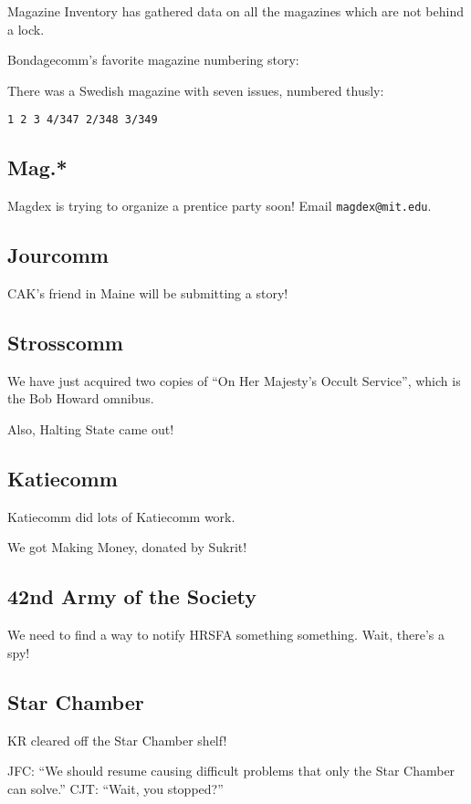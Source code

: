 \documentclass[10pt]{article}
\begin{document}
Magazine Inventory has gathered data on all the magazines which are not behind a lock.

Bondagecomm's favorite magazine numbering story:

There was a Swedish magazine with seven issues, numbered thusly: 

\texttt{1 2 3 4/347 2/348 3/349}

\subsection*{Mag.*}

Magdex is trying to organize a prentice party soon!  Email \texttt{magdex@mit.edu}.

\subsection*{Jourcomm}

CAK's friend in Maine will be submitting a story!

\subsection*{Strosscomm}

We have just acquired two copies of ``On Her Majesty's Occult Service'', which is the Bob Howard omnibus.

Also, Halting State came out!

\subsection*{Katiecomm}

Katiecomm did lots of Katiecomm work.

We got Making Money, donated by Sukrit!

\subsection*{42nd Army of the Society}

We need to find a way to notify HRSFA something something.  Wait, there's a spy!

\subsection*{Star Chamber}

KR cleared off the Star Chamber shelf!

JFC: ``We should resume causing difficult problems that only the Star Chamber can solve.''
CJT: ``Wait, you stopped?''
\end{document}

